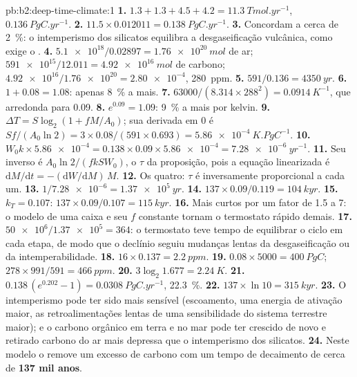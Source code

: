 \begin{solution}{pb:b2:deep-time-climate:1}
\textbf{1.} $1.3 + 1.3 + 4.5 + 4.2 = \qty{11.3}{Tmol.yr^{-1}}$, $\qty{0.136}{PgC.yr^{-1}}$.
\textbf{2.} $11.5\times0.012011 = \qty{0.138}{PgC.yr^{-1}}$.
\textbf{3.} Concordam a cerca de \qty{2}{\percent}: o intemperismo dos silicatos equilibra a desgaseificação
vulcânica, como exige o .
\textbf{4.} $\num{5.1e18}/0.02897 = \qty{1.76e20}{mol}$ de ar; $\num{591e15}/12.011 =
\qty{4.92e16}{mol}$ de carbono; $\num{4.92e16}/\num{1.76e20} = \num{2.80e-4}$, \qty{280}{ppm}.
\textbf{5.} $591/0.136 = \qty{4350}{yr}$.
\textbf{6.} $1 + 0.08 = 1.08$: apenas \qty{8}{\percent} a mais.
\textbf{7.} $63000/(8.314\times288^2) = \qty{0.0914}{K^{-1}}$, que arredonda para 0.09.
\textbf{8.} $e^{0.09} = 1.09$: \qty{9}{\percent} a mais por kelvin.
\textbf{9.} $\Delta T = S\log_2(1 + fM/A_0)$; sua derivada em 0 é $Sf/(A_0\ln2) =
3\times0.08/(591\times0.693) = \qty{5.86e-4}{K.PgC^{-1}}$.
\textbf{10.} $W_0k\times\num{5.86e-4} = 0.138\times0.09\times\num{5.86e-4} = \qty{7.28e-6}{yr^{-1}}$.
\textbf{11.} Seu inverso é $A_0\ln2/(fkSW_0)$, o $\tau$ da proposição, pois a
equação linearizada é $\mathrm dM/\mathrm dt = -(\mathrm dW/\mathrm dM)\,M$.
\textbf{12.} Os quatro: $\tau$ é inversamente proporcional a cada um.
\textbf{13.} $1/\num{7.28e-6} = \qty{1.37e5}{yr}$.
\textbf{14.} $137\times0.09/0.119 = \qty{104}{kyr}$.
\textbf{15.} $k_T = 0.107$: $137\times0.09/0.107 = \qty{115}{kyr}$.
\textbf{16.} Mais curtos por um fator de 1.5 a 7: o modelo de uma caixa e seu $f$ constante tornam o
termostato rápido demais.
\textbf{17.} $\num{50e6}/\num{1.37e5} = 364$: o termostato teve tempo de equilibrar o ciclo em cada
etapa, de modo que o declínio seguiu mudanças lentas da desgaseificação ou da intemperabilidade.
\textbf{18.} $16\times0.137 = \qty{2.2}{ppm}$.
\textbf{19.} $0.08\times5000 = \qty{400}{PgC}$; $278\times991/591 = \qty{466}{ppm}$.
\textbf{20.} $3\log_2 1.677 = \qty{2.24}{K}$.
\textbf{21.} $0.138\,(e^{0.202} - 1) = \qty{0.0308}{PgC.yr^{-1}}$, \qty{22.3}{\percent}.
\textbf{22.} $137\times\ln10 = \qty{315}{kyr}$.
\textbf{23.} O intemperismo pode ter sido mais sensível (escoamento, uma energia de ativação maior, as
retroalimentações lentas de uma sensibilidade do sistema terrestre maior); e o carbono orgânico em terra e no mar pode ter
crescido de novo e retirado carbono do ar mais depressa que o intemperismo dos silicatos.
\textbf{24.} Neste modelo o  remove um excesso de carbono com um
tempo de decaimento de cerca de \textbf{\qty[text-series-to-math=true]{137}{} mil anos}.
\end{solution}
